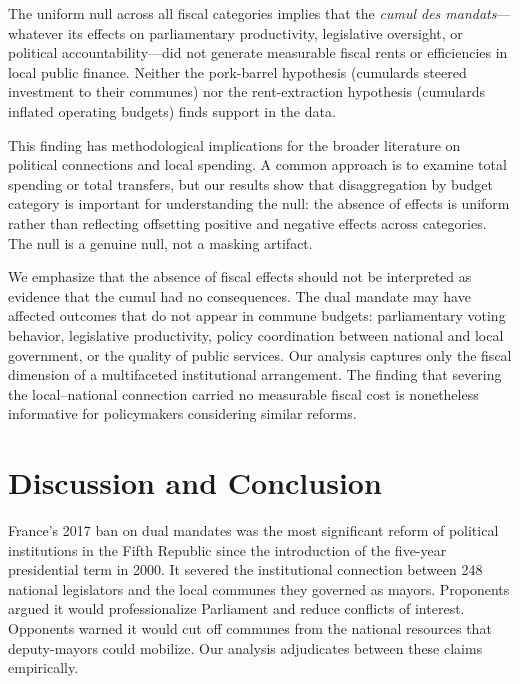 \documentclass[12pt]{article}
\begin{document}
The uniform null across all fiscal categories implies that the \textit{cumul des mandats}---whatever its effects on parliamentary productivity, legislative oversight, or political accountability---did not generate measurable fiscal rents or efficiencies in local public finance. Neither the pork-barrel hypothesis (cumulards steered investment to their communes) nor the rent-extraction hypothesis (cumulards inflated operating budgets) finds support in the data.

This finding has methodological implications for the broader literature on political connections and local spending. A common approach is to examine total spending or total transfers, but our results show that disaggregation by budget category is important for understanding the null: the absence of effects is uniform rather than reflecting offsetting positive and negative effects across categories. The null is a genuine null, not a masking artifact.

We emphasize that the absence of fiscal effects should not be interpreted as evidence that the cumul had no consequences. The dual mandate may have affected outcomes that do not appear in commune budgets: parliamentary voting behavior, legislative productivity, policy coordination between national and local government, or the quality of public services. Our analysis captures only the fiscal dimension of a multifaceted institutional arrangement. The finding that severing the local--national connection carried no measurable fiscal cost is nonetheless informative for policymakers considering similar reforms.


\section{Discussion and Conclusion}\label{sec:conclusion}

France's 2017 ban on dual mandates was the most significant reform of political institutions in the Fifth Republic since the introduction of the five-year presidential term in 2000. It severed the institutional connection between 248 national legislators and the local communes they governed as mayors. Proponents argued it would professionalize Parliament and reduce conflicts of interest. Opponents warned it would cut off communes from the national resources that deputy-mayors could mobilize. Our analysis adjudicates between these claims empirically.
\end{document}

